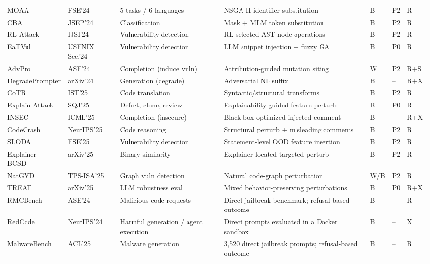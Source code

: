 \documentclass[acmsmall,screen,review]{acmart}
\begin{document}
{\begin{longtable}{@{}L{2.0cm} L{1.55cm} L{2.25cm} L{3.75cm} C{0.75cm} C{0.60cm} L{0.95cm}@{}}
MOAA~\cite{moaa2024} & FSE'24 & 5 tasks / 6 languages & NSGA-II identifier substitution & B & P2 & R \\
CBA~\cite{codebertattack2024} & JSEP'24 & Classification & Mask + MLM token substitution & B & P2 & R \\
RL-Attack~\cite{rlattack2024} & IJSI'24 & Vulnerability detection & RL-selected AST-node operations & B & P2 & R \\
EaTVul~\cite{liu2024eatvul} & USENIX Sec.'24 & Vulnerability detection & LLM snippet injection + fuzzy GA & B & P0 & R \\
AdvPro~\cite{jiang2024advpro} & ASE'24 & Completion (induce vuln) & Attribution-guided mutation siting & W & P2 & R+S \\
Degrade\allowbreak{}Prompter \cite{degradeprompter2024} & arXiv'24 & Generation (degrade) & Adversarial NL suffix & B & -- & R+X \\
CoTR~\cite{yang2025cotr} & IST'25 & Code translation & Syntactic/structural transforms & B & P2 & R \\
Explain-Attack~\cite{explainability2025} & SQJ'25 & Defect, clone, review & Explainability-guided feature perturb & B & P0 & R \\
INSEC~\cite{jenko2025insec} & ICML'25 & Completion (insecure) & Black-box optimized injected comment & B & -- & R+X \\
CodeCrash~\cite{codecrash2025} & NeurIPS'25 & Code reasoning & Structural perturb + misleading comments & B & P2 & R \\
SLODA~\cite{sloda2025} & FSE'25 & Vulnerability detection & Statement-level OOD feature insertion & B & P2 & R \\
Explainer-BCSD~\cite{explainerbcsd2025} & arXiv'25 & Binary similarity & Explainer-located targeted perturb & B & P2 & R \\
NatGVD~\cite{natgvd2025} & TPS-ISA'25 & Graph vuln detection & Natural code-graph perturbation & W/B & P2 & R \\
TREAT~\cite{treat2025} & arXiv'25 & LLM robustness eval & Mixed behavior-preserving perturbations & B & P0 & R+X \\
RMCBench~\cite{rmcbench2024} & ASE'24 & Malicious-code requests & Direct jailbreak benchmark; refusal-based outcome & B & -- & R \\
RedCode~\cite{redcode2024} & NeurIPS'24 & Harmful generation / agent execution & Direct prompts evaluated in a Docker sandbox & B & -- & X \\
MalwareBench \cite{malwarebench2025} & ACL'25 & Malware generation & 3,520 direct jailbreak prompts; refusal-based outcome & B & -- & R \\
\end{longtable}
}
\end{document}
